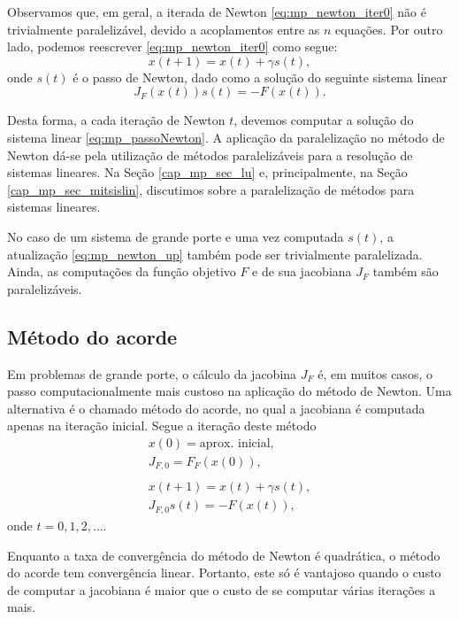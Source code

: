 Observamos que, em geral, a iterada de Newton \eqref{eq:mp_newton_iter0} não é trivialmente paralelizável, devido a acoplamentos entre as $n$ equações. Por outro lado, podemos reescrever \eqref{eq:mp_newton_iter0} como segue:
\begin{equation}\label{eq:mp_newton_up}
  x(t+1) = x(t) + \gamma s(t),
\end{equation}
onde $s(t)$ é o passo de Newton, dado como a solução do seguinte sistema linear
\begin{equation}\label{eq:mp_passoNewton}
  J_F\left(x(t)\right)s(t) = -F\left(x(t)\right).
\end{equation}

Desta forma, a cada iteração de Newton $t$, devemos computar a solução do sistema linear \eqref{eq:mp_passoNewton}. A aplicação da paralelização no método de Newton dá-se pela utilização de métodos paralelizáveis para a resolução de sistemas lineares. Na Seção \ref{cap_mp_sec_lu} e, principalmente, na Seção \ref{cap_mp_sec_mitsislin}, discutimos sobre a paralelização de métodos para sistemas lineares.

No caso de um sistema de grande porte e uma vez computada $s(t)$, a atualização \eqref{eq:mp_newton_up} também pode ser trivialmente paralelizada. Ainda, as computações da função objetivo $F$ e de sua jacobiana $J_F$ também são paralelizáveis.

\subsection{Método do acorde}

Em problemas de grande porte, o cálculo da jacobina $J_F$ é, em muitos casos, o passo computacionalmente mais custoso na aplicação do método de Newton. Uma alternativa é o chamado método do acorde, no qual a jacobiana é computada apenas na iteração inicial. Segue a iteração deste método
\begin{gather}
  x(0) = \text{aprox. inicial},\\
  J_{F,0} = F_F\left(x(0)\right),\label{eq:mp_acorde_jac}\\
  ~\nonumber\\
  x(t+1) = x(t) + \gamma s(t),\label{eq:mp_acorde_up}\\
  J_{F,0}s(t) = -F(x(t)),\label{eq:mp_acorde_dir}
\end{gather}
onde $t=0, 1, 2, \ldots$.

Enquanto a taxa de convergência do método de Newton é quadrática, o método do acorde tem convergência linear. Portanto, este só é vantajoso quando o custo de computar a jacobiana é maior que o custo de se computar várias iterações a mais.

